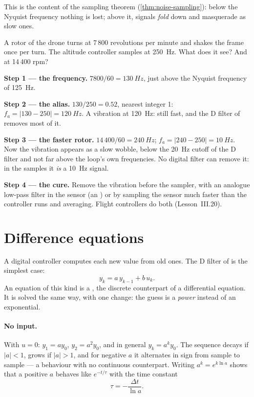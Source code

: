 This is the content of the sampling theorem (\cref{thm:noise-sampling}): below the Nyquist frequency nothing is lost; above it, signals \emph{fold} down and masquerade as slow ones.

\begin{example}
\label{ex:D-alias}
A rotor of the drone turns at 7\,800 revolutions per minute and shakes the frame once per turn. The altitude controller samples at \SI{250}{Hz}. What does it see? And at 14\,400 rpm?

\textbf{Step 1 — the frequency.} $7800/60 = \SI{130}{Hz}$, just above the Nyquist frequency of \SI{125}{Hz}.

\textbf{Step 2 — the alias.} $130/250 = 0.52$, nearest integer 1: $f_a = |130 - 250| = \SI{120}{Hz}$. A vibration at \SI{120}{Hz}: still fast, and the D filter of  removes most of it.

\textbf{Step 3 — the faster rotor.} $14\,400/60 = \SI{240}{Hz}$; $f_a = |240 - 250| = \SI{10}{Hz}$. Now the vibration appears as a slow wobble, below the \SI{20}{Hz} cutoff of the D filter and not far above the loop's own frequencies. No digital filter can remove it: in the samples it \emph{is} a \SI{10}{Hz} signal.

\textbf{Step 4 — the cure.} Remove the vibration before the sampler, with an analogue low-pass filter in the sensor (an ) or by sampling the sensor much faster than the controller runs and averaging. Flight controllers do both (Lesson~III.20).
\end{example}

\section{Difference equations}

A digital controller computes each new value from old ones. The D filter of  is the simplest case:
\begin{equation}\label{eq:D-first}
  y_k = a\,y_{k-1} + b\,u_k .
\end{equation}
An equation of this kind is a , the discrete counterpart of a differential equation. It is solved the same way, with one change: the guess is a \emph{power} instead of an exponential.

\paragraph{No input.} With $u = 0$: $y_1 = a y_0$, $y_2 = a^2y_0$, and in general $y_k = a^k y_0$. The sequence decays if $|a| < 1$, grows if $|a| > 1$, and for negative $a$ it alternates in sign from sample to sample — a behaviour with no continuous counterpart. Writing $a^k = e^{k\ln a}$ shows that a positive $a$ behaves like $e^{-t/\tau}$ with the time constant
\begin{equation}\label{eq:D-tau}
  \tau = -\frac{\Delta t}{\ln a} .
\end{equation}

